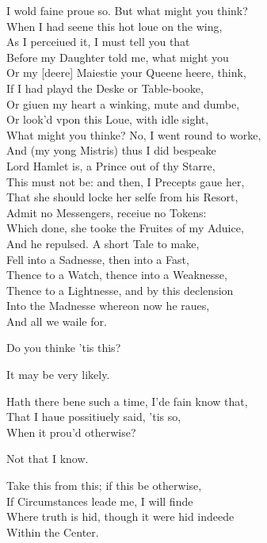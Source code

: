 \documentclass[a5paper,DIV=calc,11pt]{scrbook}
\begin{document}
\begin{drama*}
    \polspeaks I wold faine proue so. But what might you think?\\
    When I had seene this hot loue on the wing,\\
    As I perceiued it, I must tell you that\\
    Before my Daughter told me, what might you\\
    Or my [deere] Maiestie your Queene heere, think,\\
    If I had playd the Deske or Table-booke,\\
    Or giuen my heart a winking, mute and dumbe,\\
    Or look'd vpon this Loue, with idle sight,\\
    What might you thinke? No, I went round to worke,\\
    And (my yong Mistris) thus I did bespeake\\
    Lord Hamlet is, a Prince out of thy Starre,\\
    This must not be: and then, I Precepts gaue her,\\
    That she should locke her selfe from his Resort,\\
    Admit no Messengers, receiue no Tokens:\\
    Which done, she tooke the Fruites of my Aduice,\\
    And he repulsed. A short Tale to make,\\
    Fell into a Sadnesse, then into a Fast,\\
    Thence to a Watch, thence into a Weaknesse,\\
    Thence to a Lightnesse, and by this declension\\
    Into the Madnesse whereon now he raues,\\
    And all we waile for.
    
    \kingspeaks Do you thinke 'tis this?
    
    \queenspeaks It may be very likely.
    
    \polspeaks Hath there bene such a time, I'de fain know that,\\
    That I haue possitiuely said, 'tis so,\\
    When it prou'd otherwise?
    
    \kingspeaks Not that I know.
    
    \polspeaks Take this from this; if this be otherwise,\\
    If Circumstances leade me, I will finde\\
    Where truth is hid, though it were hid indeede\\
    Within the Center.
    

\end{drama*}
\end{document}
